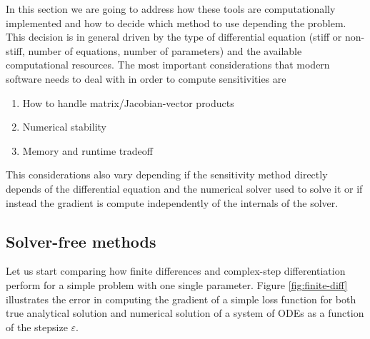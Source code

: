 
In this section we are going to address how these tools are computationally implemented and how to decide which method to use depending the problem. 
This decision is in general driven by the type of differential equation (stiff or non-stiff, number of equations, number of parameters) and the available computational resources. 
The most important considerations that modern software needs to deal with in order to compute sensitivities are 
\begin{enumerate}
    \item How to handle matrix/Jacobian-vector products
    \item Numerical stability
    \item Memory and runtime tradeoff
\end{enumerate}
This considerations also vary depending if the sensitivity method directly depends of the differential equation and the numerical solver used to solve it or if instead the gradient is compute independently of the internals of the solver. 


\subsection{Solver-free methods}

Let us start comparing how finite differences and complex-step differentiation perform for a simple problem with one single parameter. 
Figure \ref{fig:finite-diff} illustrates the error in computing the gradient of a simple loss function for both true analytical solution and numerical solution of a system of ODEs as a function of the stepsize $\varepsilon$.

